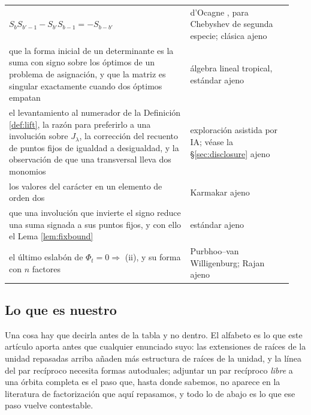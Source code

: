 \documentclass[11pt,reqno]{amsart}
\newcommand{\stext}{\textcolor{hext}{\small ajeno}}
\theoremstyle{plain}
\theoremstyle{definition}
\begin{document}
\begin{longtable}{@{}>{\raggedright\arraybackslash}p{0.60\linewidth}%
                   >{\raggedright\arraybackslash}p{0.34\linewidth}@{}}
$S_bS_{b'-1}-S_{b'}S_{b-1}=-S_{b-b'}$ & d'Ocagne \cite{Doc}, para Chebyshev de segunda especie;
clásica \stext\\
que la forma inicial de un determinante es la suma con signo sobre los óptimos de un problema de
asignación, y que la matriz es singular exactamente cuando dos óptimos empatan & álgebra lineal
tropical, estándar \cite{TropCramer} \stext\\
el levantamiento al numerador de la Definición \ref{def:lift}, la razón para preferirlo a
una involución sobre $J_\lambda$, la corrección del recuento de puntos fijos de igualdad a
desigualdad, y la observación de que una transversal lleva dos monomios & exploración asistida
por IA; véase la \S\ref{sec:disclosure} \stext\\
los valores del carácter en un elemento de orden dos & Karmakar \cite{Kar24} \stext\\
que una involución que invierte el signo reduce una suma signada a sus puntos fijos, y con ello el
Lema \ref{lem:fixbound} & estándar \stext\\
el último eslabón de $\Phi_t=0\Rightarrow$ (ii), y su forma con $n$ factores & Purbhoo--van
Willigenburg; Rajan \cite{PvW,Rajan} \stext\\
\bottomrule
\end{longtable}
\endgroup

\subsection*{Lo que es nuestro}

Una cosa hay que decirla antes de la tabla y no dentro. El alfabeto es lo que este artículo aporta
antes que cualquier enunciado suyo: las extensiones de raíces de la unidad repasadas arriba añaden más estructura de raíces de la
unidad, y la línea del par recíproco necesita formas autoduales; adjuntar un par recíproco
\emph{libre} a una órbita completa es el paso que, hasta donde sabemos, no aparece en la literatura
de factorización que aquí repasamos, y todo lo de abajo es lo que ese paso vuelve contestable.
\end{document}
